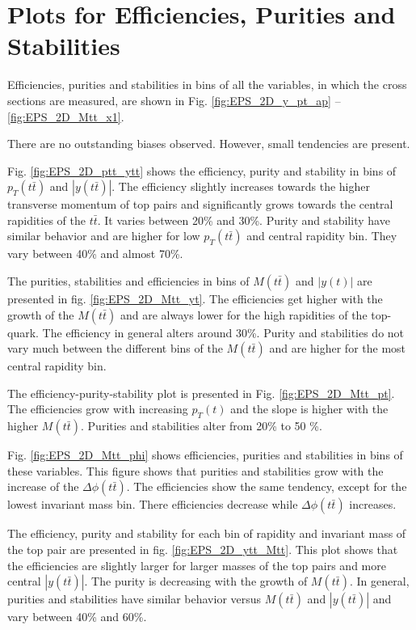 \chapter{Plots for Efficiencies, Purities and Stabilities}\label{appendix:EPS}

Efficiencies, purities and stabilities in bins of all the variables, in which the cross sections
are measured, are shown in Fig. \ref{fig:EPS_2D_y_pt_ap} -- \ref{fig:EPS_2D_Mtt_x1}.

There are no outstanding biases observed. However, small tendencies are present. 

Fig. \ref{fig:EPS_2D_ptt_ytt} shows the efficiency, purity and stability in bins of $p_{T}(t\bar{t})$ and $|y(t\bar{t})|$. The efficiency
slightly increases towards the higher transverse momentum of top pairs and significantly grows towards the central rapidities of the $t\bar{t}$. It varies
between 20\% and 30\%. Purity
and stability have similar behavior and are higher for low $p_{T}(t\bar{t})$ and central rapidity bin. They vary between 40\% and almost 70\%.

The purities, stabilities and efficiencies in bins of $M(t\bar{t})$ and $|y(t)|$ are presented in fig. \ref{fig:EPS_2D_Mtt_yt}. The efficiencies get higher with the 
growth of the $M(t\bar{t})$ and are always lower for the high rapidities of the top-quark. The efficiency in general alters around 30\%. Purity and stabilities
do not vary much between the different bins of the $M(t\bar{t})$ and are higher for the most central rapidity bin.

The efficiency-purity-stability plot is presented in Fig. \ref{fig:EPS_2D_Mtt_pt}. The efficiencies grow with increasing $p_{T}(t)$ and the slope is higher with
the higher $M(t\bar{t})$. Purities and stabilities alter from 20\% to 50 \%.

Fig. \ref{fig:EPS_2D_Mtt_phi} shows efficiencies, purities and stabilities in bins of these variables. This figure shows that purities and stabilities grow with the 
increase of the $\Delta\phi(t\bar{t})$. The efficiencies show the same tendency, except for the lowest invariant mass bin. There efficiencies decrease while $\Delta\phi(t\bar{t})$
increases.

The efficiency, purity and stability for each bin of rapidity and invariant mass of the top pair are presented in fig. \ref{fig:EPS_2D_ytt_Mtt}. This plot
shows that the efficiencies are slightly larger for larger masses of the top pairs and more central $|y(t\bar{t})|$. The purity is decreasing with the
growth of $M(t\bar{t})$. In general, purities and stabilities have similar behavior versus $M(t\bar{t})$ and $|y(t\bar{t})|$ and vary between 40\% and 60\%.

